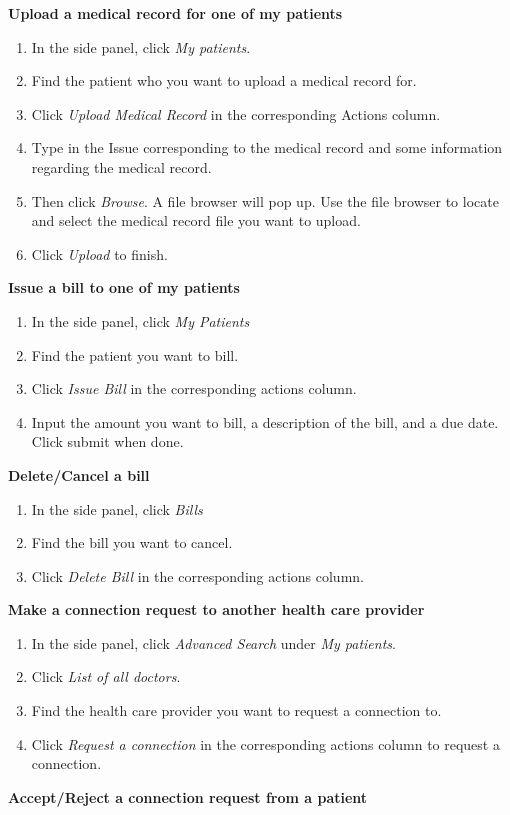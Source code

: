 \documentclass[10pt]{report}
\begin{document}
\textbf{Upload a medical record for one of my patients}
\begin{enumerate}
\item In the side panel, click \textit{My patients}.
\item Find the patient who you want to upload a medical record for.
\item Click \textit{Upload Medical Record} in the corresponding Actions column.
\item Type in the Issue corresponding to the medical record and some information regarding the medical record.
\item Then click \textit{Browse}. A file browser will pop up. Use the file browser to locate and select the medical record file you want to upload.
\item Click \textit{Upload} to finish.
\end{enumerate}
\textbf{Issue a bill to one of my patients}
\begin{enumerate}
\item In the side panel, click \textit{My Patients}
\item Find the patient you want to bill. 
\item Click \textit{Issue Bill} in the corresponding actions column.
\item Input the amount you want to bill, a description of the bill, and a due date. Click submit when done.
\end{enumerate}
\textbf{Delete/Cancel a bill}
\begin{enumerate}
\item In the side panel, click \textit{Bills}
\item Find the bill you want to cancel.
\item Click \textit{Delete Bill} in the corresponding actions column.
\end{enumerate}
\textbf{Make a connection request to another health care provider}
\begin{enumerate}
\item In the side panel, click \textit{Advanced Search} under \textit{My patients}.
\item Click \textit{List of all doctors}.
\item Find the health care provider you want to request a connection to.
\item Click \textit{Request a connection} in the corresponding actions column to request a connection.
\end{enumerate}
\textbf{Accept/Reject a connection request from a patient}
\end{document}
